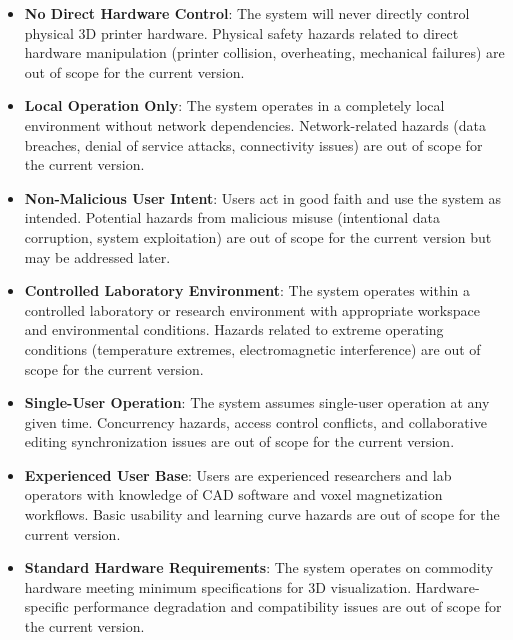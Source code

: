 \documentclass{article}
\begin{document}
\begin{itemize}
    \item \textbf{No Direct Hardware Control}: The system will never directly control physical 3D printer hardware. Physical safety hazards related to direct hardware manipulation (printer collision, overheating, mechanical failures) are out of scope for the current version.

    \item \textbf{Local Operation Only}: The system operates in a completely local environment without network dependencies. Network-related hazards (data breaches, denial of service attacks, connectivity issues) are out of scope for the current version.

    \item \textbf{Non-Malicious User Intent}: Users act in good faith and use the system as intended. Potential hazards from malicious misuse (intentional data corruption, system exploitation) are out of scope for the current version but may be addressed later.

    \item \textbf{Controlled Laboratory Environment}: The system operates within a controlled laboratory or research environment with appropriate workspace and environmental conditions. Hazards related to extreme operating conditions (temperature extremes, electromagnetic interference) are out of scope for the current version.

    \item \textbf{Single-User Operation}: The system assumes single-user operation at any given time. Concurrency hazards, access control conflicts, and collaborative editing synchronization issues are out of scope for the current version.

    \item \textbf{Experienced User Base}: Users are experienced researchers and lab operators with knowledge of CAD software and voxel magnetization workflows. Basic usability and learning curve hazards are out of scope for the current version.

    \item \textbf{Standard Hardware Requirements}: The system operates on commodity hardware meeting minimum specifications for 3D visualization. Hardware-specific performance degradation and compatibility issues are out of scope for the current version.
\end{itemize}

\end{document}
